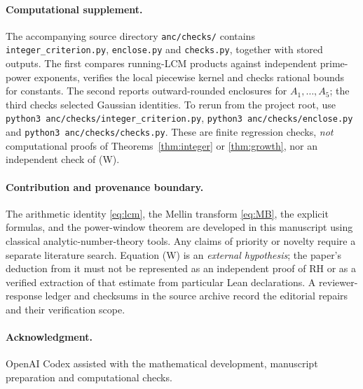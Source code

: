 \documentclass[11pt,a4paper]{article}
\begin{document}
\paragraph{Computational supplement.}
The accompanying source directory \texttt{anc/checks/} contains \texttt{integer\_criterion.py}, \texttt{enclose.py} and \texttt{checks.py}, together with stored outputs. The first compares running-LCM products against independent prime-power exponents, verifies the local piecewise kernel and checks rational bounds for constants. The second reports outward-rounded enclosures for $A_1,\ldots,A_5$; the third checks selected Gaussian identities. To rerun from the project root, use \texttt{python3 anc/checks/integer\_criterion.py}, \texttt{python3 anc/checks/enclose.py} and \texttt{python3 anc/checks/checks.py}. These are finite regression checks, \emph{not} computational proofs of Theorems~\ref{thm:integer} or \ref{thm:growth}, nor an independent check of (W).

\paragraph{Contribution and provenance boundary.}
The arithmetic identity \eqref{eq:lcm}, the Mellin transform \eqref{eq:MB}, the explicit formulas, and the power-window theorem are developed in this manuscript using classical analytic-number-theory tools. Any claims of priority or novelty require a separate literature search. Equation (W) is an \emph{external hypothesis}; the paper's deduction from it must not be represented as an independent proof of RH or as a verified extraction of that estimate from particular Lean declarations. A reviewer-response ledger and checksums in the source archive record the editorial repairs and their verification scope.

\paragraph{Acknowledgment.}
OpenAI Codex assisted with the mathematical development, manuscript preparation and computational checks.
\end{document}
